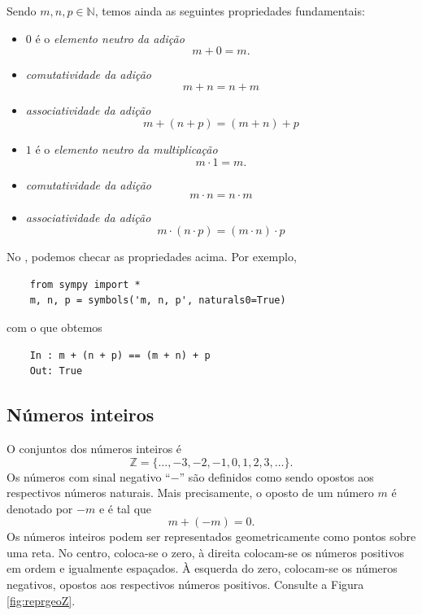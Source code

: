 Sendo $m, n, p\in\mathbb{N}$, temos ainda as seguintes propriedades fundamentais:
\begin{itemize}
\item $0$ é o \emph{elemento neutro da adição}
  \begin{equation}
    m + 0 = m.
  \end{equation}
\item \emph{comutatividade da adição}
  \begin{equation}
    m + n = n + m
  \end{equation}
\item \emph{associatividade da adição}
  \begin{equation}
    m + (n + p) = (m + n) + p
  \end{equation}
\item $1$ é o \emph{elemento neutro da multiplicação}
  \begin{equation}
    m \cdot 1 = m.
  \end{equation}
\item \emph{comutatividade da adição}
  \begin{equation}
    m \cdot n = n \cdot m
  \end{equation}
\item \emph{associatividade da adição}
  \begin{equation}
    m \cdot (n \cdot p) = (m \cdot n) \cdot p
  \end{equation}
\end{itemize}

\ifispython
\begin{obs}
  No \python, podemos checar as propriedades acima. Por exemplo,
  \begin{lstlisting}
    from sympy import *
    m, n, p = symbols('m, n, p', naturals0=True)
  \end{lstlisting}
  com o que obtemos
  \begin{lstlisting}
    In : m + (n + p) == (m + n) + p
    Out: True
  \end{lstlisting}
\end{obs}
\fi

\subsection{Números inteiros}

O conjuntos dos números inteiros é
\begin{equation}
  \mathbb{Z} = \{\ldots, -3, -2 , -1, 0, 1, 2, 3, \ldots\}.
\end{equation}
Os números com sinal negativo ``$-$'' são definidos como sendo opostos aos respectivos números naturais. Mais precisamente, o oposto de um número $m$ é denotado por $-m$ e é tal que
\begin{equation}
  m + (-m) = 0.
\end{equation}
Os números inteiros podem ser representados geometricamente como pontos sobre uma reta. No centro, coloca-se o zero, à direita colocam-se os números positivos em ordem e igualmente espaçados. À esquerda do zero, colocam-se os números negativos, opostos aos respectivos números positivos. Consulte a Figura \ref{fig:reprgeoZ}.

